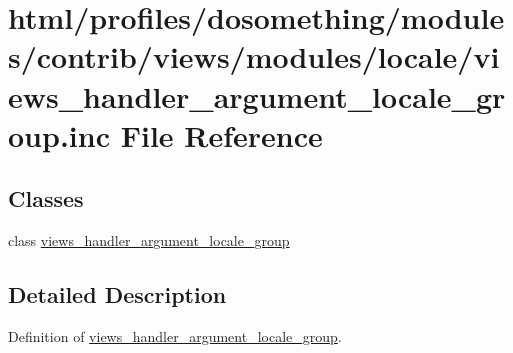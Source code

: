 \hypertarget{views__handler__argument__locale__group_8inc}{
\section{html/profiles/dosomething/modules/contrib/views/modules/locale/views\_\-handler\_\-argument\_\-locale\_\-group.inc File Reference}
\label{views__handler__argument__locale__group_8inc}
}
\subsection*{Classes}
\begin{DoxyCompactItemize}
\item 
class \hyperlink{classviews__handler__argument__locale__group}{views\_\-handler\_\-argument\_\-locale\_\-group}
\end{DoxyCompactItemize}


\subsection{Detailed Description}
Definition of \hyperlink{classviews__handler__argument__locale__group}{views\_\-handler\_\-argument\_\-locale\_\-group}. 